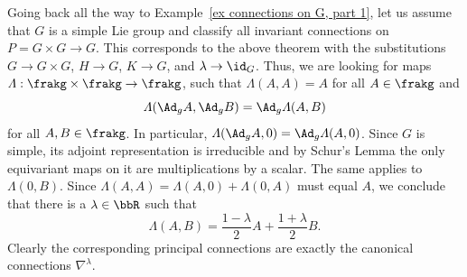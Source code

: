 \begin{example}\label{ex connections on G, part 6}
    Going back all the way to Example~\ref{ex connections on G, part 1}, 
    let us assume that $G$ is a simple Lie group and classify all invariant connections on $P=G\times G\to G$. This corresponds to the above theorem with the substitutions $G\to G\times G$, $H\to G$, $K\to G$, and $\lambda\to\id_G$. Thus, we are looking for maps  $\varLambda:\frakg\times\frakg\to\frakg$, such that $\varLambda(A,A)=A$ for all $A\in\frakg$ and 
    \[\varLambda(\Ad_{g} A,\Ad_{g}B)=\Ad_g\varLambda(A,B)\]
    for all $A,B\in\frakg$. In particular, $\varLambda(\Ad_g A,0)=\Ad_g \varLambda(A,0)$. Since $G$ is simple, its adjoint representation is irreducible and by Schur's Lemma the only equivariant maps on it are multiplications by a scalar. The same applies to $\varLambda(0,B)$. Since $\varLambda(A,A)=\varLambda(A,0)+\varLambda(0,A)$ must equal $A$, we conclude that there is a $\lambda\in\bbR$ such that 
    \[\varLambda(A,B)=\frac{1-\lambda}{2}A+\frac{1+\lambda}{2}B.\]
    Clearly the corresponding principal connections are exactly the canonical connections $\nabla^\lambda$.

\end{example}



